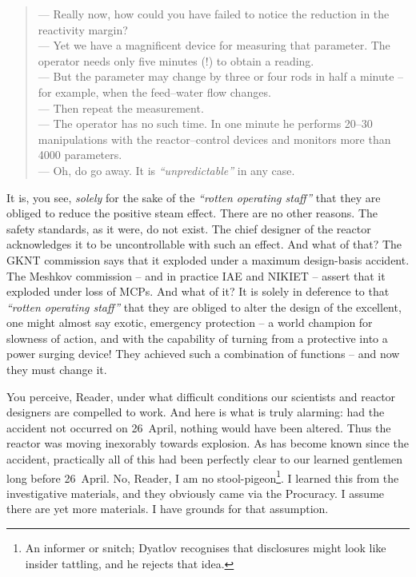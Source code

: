 \documentclass[openright]{bookest}
\begin{document}
\begin{quote}
--- Really now, how could you have failed to notice the reduction in the reactivity margin? \\
--- Yet we have a magnificent device for measuring that parameter. The operator needs only five minutes (!) to obtain a reading. \\
--- But the parameter may change by three or four rods in half a minute -- for example, when the feed--water flow changes. \\
--- Then repeat the measurement. \\
--- The operator has no such time. In one minute he performs \numrange{20}{30} manipulations with the reactor--control devices and monitors more than \num{4000} parameters. \\
--- Oh, do go away. It is \textit{``unpredictable''} in any case.
\end{quote}

It is, you see, \textit{solely} for the sake of the \textit{``rotten operating staff''} that they are obliged to reduce the positive steam effect. There are no other reasons. The safety standards, as it were, do not exist. The chief designer of the reactor acknowledges it to be uncontrollable with such an effect. And what of that? The GKNT commission says that it exploded under a maximum design-basis accident. The Meshkov commission -- and in practice IAE and NIKIET -- assert that it exploded under loss of MCPs. And what of it? It is solely in deference to that \textit{``rotten operating staff''} that they are obliged to alter the design of the excellent, one might almost say exotic, emergency protection -- a world champion for slowness of action, and with the capability of turning from a protective into a power surging device! They achieved such a combination of functions -- and now they must change it.

You perceive, Reader, under what difficult conditions our scientists and reactor designers are compelled to work. And here is what is truly alarming: had the accident not occurred on 26~April, nothing would have been altered. Thus the reactor was moving inexorably towards explosion. As has become known since the accident, practically all of this had been perfectly clear to our learned gentlemen long before 26~April. No, Reader, I am no stool-pigeon\footnote{An informer or snitch; Dyatlov recognises that disclosures might look like insider tattling, and he rejects that idea.}. I learned this from the investigative materials, and they obviously came via the Procuracy. I assume there are yet more materials. I have grounds for that assumption.
\end{document}
